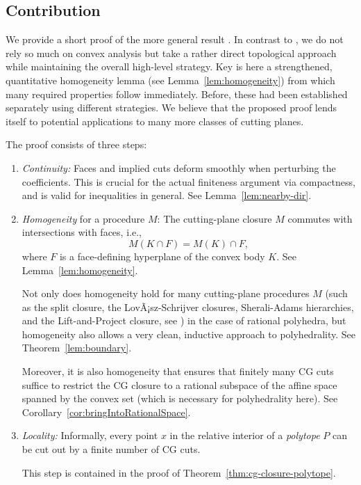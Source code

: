 \documentclass[11pt]{article}
\theoremstyle{remark}
\begin{document}
\subsection*{Contribution}
\label{sec:contribution}
We provide a short proof of the more general result \cite{DDV2011}. In
contrast to \cite{DDV2011}, we do not rely so much on convex
analysis but take a rather direct topological approach while
maintaining the overall high-level strategy. Key is here a
strengthened, quantitative homogeneity lemma (see
Lemma~\ref{lem:homogeneity}) from which many required properties
follow immediately. Before, these had been established separately using
different strategies. We believe that the proposed proof
lends itself to potential applications to
many more classes of cutting planes.

The proof consists of three steps:

\begin{enumerate}

\item \emph{Continuity:} 
 Faces and
  implied cuts deform smoothly when
  perturbing the coefficients. This is crucial for the
  actual finiteness argument via compactness, and is valid for
  inequalities in general. See Lemma~\ref{lem:nearby-dir}.

\item \emph{Homogeneity} for a procedure \(M\):
 The cutting-plane closure \(M\) commutes with intersections with faces, i.e.,
 \[M(K \cap F) = M(K) \cap F,\]
 where \(F\) is a face-defining hyperplane of the convex body
 \(K\). See Lemma~\ref{lem:homogeneity}.

 Not only does homogeneity hold for many
 cutting-plane procedures \(M\) (such as the split closure, the
 LovÃ¡sz-Schrijver closures, Sherali-Adams hierarchies, and the
 Lift-and-Project closure, see \cite{PS20091}) in the case of rational
 polyhedra, but
 homogeneity also allows a very clean, inductive approach
to polyhedrality. See Theorem~\ref{lem:boundary}.

Moreover, it is also homogeneity that ensures
that finitely many {CG\xspace} cuts suffice to restrict the {CG\xspace} closure
to a rational subspace of the affine space spanned by the convex set
(which is necessary for
polyhedrality here). See Corollary~\ref{cor:bringIntoRationalSpace}.
\item \emph{Locality:}  Informally,
  every point \(x\) in the relative interior of a
  \emph{polytope} \(P\) can be cut out by  a finite number of
  {CG\xspace} cuts.

  This step is contained in the proof
  of Theorem~\ref{thm:cg-closure-polytope}.
\end{enumerate}
\end{document}
